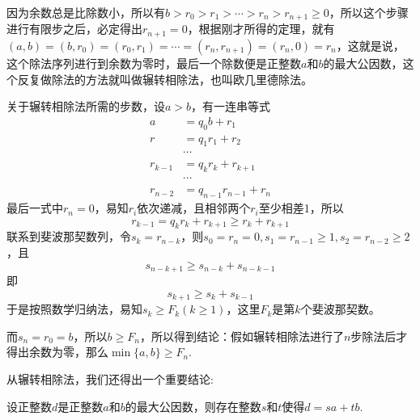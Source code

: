 因为余数总是比除数小，所以有$b > r_0 > r_1 > \cdots > r_n > r_{n+1} \geqslant 0$，所以这个步骤进行有限步之后，必定得出$r_{n+1}=0$，根据刚才所得的定理，就有$(a,b)=(b,r_0)=(r_0,r_1)=\cdots=(r_n, r_{n+1})=(r_n,0)=r_n$，这就是说，这个除法序列进行到余数为零时，最后一个除数便是正整数$a$和$b$的最大公因数，这个反复做除法的方法就叫做辗转相除法，也叫欧几里德除法。

\begin{example}[辗转相除法所需的步数]
  关于辗转相除法所需的步数，设$a>b$，有一连串等式
\begin{align*}
a & =  q_0b+r_1 \\
r & = q_1 r_1+r_2 \\
&\cdots \\
r_{k-1}&=q_k r_k + r_{k+1} \\
&\cdots \\
r_{n-2}&=q_{n-1}r_{n-1}+r_n
\end{align*}
最后一式中$r_n=0$，易知$r_i$依次递减，且相邻两个$r_i$至少相差1，所以
\[ r_{k-1}=q_k r_k + r_{k+1} \geqslant r_k + r_{k+1}  \]
联系到斐波那契数列，令$s_k=r_{n-k}$，则$s_0=r_n=0, s_1=r_{n-1} \geqslant 1,  s_2=r_{n-2} \geqslant 2$，且
\[ s_{n-k+1} \geqslant s_{n-k}+s_{n-k-1}   \]
即
\[ s_{k+1} \geqslant s_{k}+s_{k-1} \]
于是按照数学归纳法，易知$s_k \geqslant F_k(k \geqslant 1)$，这里$F_k$是第$k$个斐波那契数。

而$s_n=r_0=b$，所以$b \geqslant F_n$，所以得到结论：假如辗转相除法进行了$n$步除法后才得出余数为零，那么$\min\{a,b\} \geqslant F_n$.
\end{example}

从辗转相除法，我们还得出一个重要结论:
\begin{theorem}
  设正整数$d$是正整数$a$和$b$的最大公因数，则存在整数$s$和$t$使得$d=sa+tb$.
\end{theorem}

